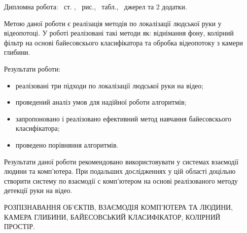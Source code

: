 
Дипломна робота: \pageref*{MyLastPage}~ст. , \totfig~рис.,  \tottab~табл., ~джерел та 2 додатки.

Метою даної роботи є реалізація методів по локалізації людської руки у відеопотоці. У роботі реалізовані такі методи як: віднімання фону, колірний фільтр на основі байесовскього класифікатора та обробка відеопотоку з камери глибини.

Результати роботи:
\begin{itemize}
	\item реалізовані три підходи по локалізації людської руки на відео;
	\item проведений аналіз умов для надійної роботи алгоритмів;
	\item запропоновано і реалізовано ефективний метод навчання байесовскього класифікатора;
	\item проведено порівняння алгоритмів.
\end{itemize}

Результати даної роботи рекомендовано використовувати у системах взаємодії людини та комп'ютера.
При подальших дослідженнях у цій області доцільно створити систему по взаємодії с комп'ютером на основі реалізованого методу детекції руки на відео.

\MakeUppercase{Розпізнавання об'єктів, взаємодія комп'ютера та людини, камера глибини, Байесовський класифікатор, колірний простір.} 